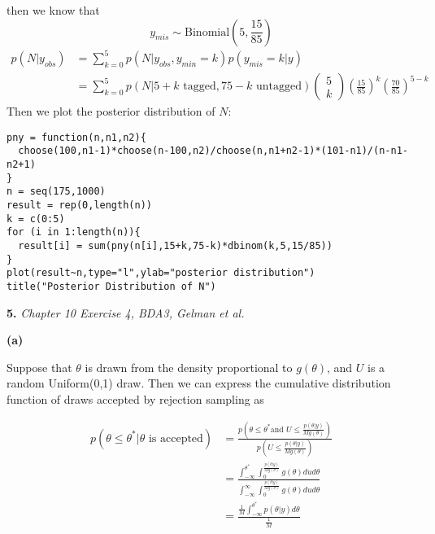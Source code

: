 \documentclass[letterpaper,11pt]{article}
\begin{document}
then we know that
$$y_{mis}\sim \text{Binomial}(5,\frac{15}{85})$$
\begin{align}
	p(N\vert y_{obs}) &= \sum_{k=0}^{5}p(N\vert y_{obs},y_{min}=k)p(y_{mis}=k\vert y)\nonumber\\
	&= \sum_{k=0}^{5}p(N\vert  5+k \text{ tagged}, 75-k\text{ untagged})\begin{pmatrix}
	5\\
k
\end{pmatrix}(\frac{15}{85})^k(\frac{70}{85})^{5-k}\nonumber
\end{align}
Then we plot the posterior distribution of $N$:

\begin{lstlisting}
pny = function(n,n1,n2){
  choose(100,n1-1)*choose(n-100,n2)/choose(n,n1+n2-1)*(101-n1)/(n-n1-n2+1)
}
n = seq(175,1000)
result = rep(0,length(n))
k = c(0:5)
for (i in 1:length(n)){
  result[i] = sum(pny(n[i],15+k,75-k)*dbinom(k,5,15/85))
}
plot(result~n,type="l",ylab="posterior distribution")
title("Posterior Distribution of N")
\end{lstlisting}

\begin{center}
  \makebox[\linewidth]{\texttt{[image: 4640HW53]}}
\end{center}

\newpage
\begin{addmargin}[-2em]{0em} \large{\textbf{5. }}\large{\textsl{Chapter 10 Exercise 4, BDA3, Gelman et al.}} \end{addmargin}



\begin{addmargin}[-1.1em]{0em} \textbf{(a)}\par \end{addmargin}


Suppose that $\theta$ is drawn from the density proportional to $g(\theta)$, and $U$ is a random Uniform(0,1) draw. Then we can express the cumulative distribution function of draws accepted by rejection sampling as

\begin{align}
p(\theta\leq\theta^{*}\vert\theta\text{ is accepted}) &= \frac{p(\theta\leq\theta^{*}\text{and }U\leq\frac{p(\theta\vert y)}{Mg(\theta)})}{p(U\leq\frac{p(\theta\vert y)}{Mg(\theta)})}\nonumber\\
&=\frac{\int_{-\infty}^{\theta^{*}}\int_0^{\frac{p(\theta\vert y)}{Mg(\theta)}}g(\theta)dud\theta}{\int_{-\infty}^{\infty}\int_0^{\frac{p(\theta\vert y)}{Mg(\theta)}}g(\theta)dud\theta}\nonumber\\
&=\frac{\frac{1}{M}\int_{-\infty}^{\theta^{*}}p(\theta\vert y)d\theta}{\frac{1}{M}}\nonumber
\end{align}
\end{document}
